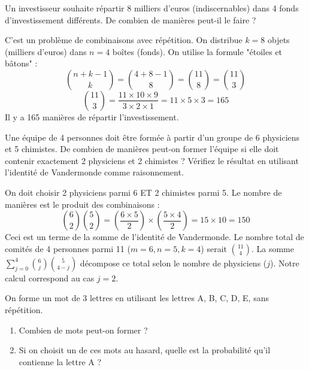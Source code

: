 \begin{exercicebox}
Un investisseur souhaite répartir 8 milliers d'euros (indiscernables) dans 4 fonds d'investissement différents. De combien de manières peut-il le faire ?
\end{exercicebox}

\begin{correctionbox}
C'est un problème de combinaisons avec répétition. On distribue $k=8$ objets (milliers d'euros) dans $n=4$ boîtes (fonds).
On utilise la formule "étoiles et bâtons" :
$$ \binom{n+k-1}{k} = \binom{4+8-1}{8} = \binom{11}{8} = \binom{11}{3} $$
$$ \binom{11}{3} = \frac{11 \times 10 \times 9}{3 \times 2 \times 1} = 11 \times 5 \times 3 = 165 $$
Il y a 165 manières de répartir l'investissement.
\end{correctionbox}

\begin{exercicebox}
Une équipe de 4 personnes doit être formée à partir d'un groupe de 6 physiciens et 5 chimistes. De combien de manières peut-on former l'équipe si elle doit contenir exactement 2 physiciens et 2 chimistes ? Vérifiez le résultat en utilisant l'identité de Vandermonde comme raisonnement.
\end{exercicebox}

\begin{correctionbox}
On doit choisir 2 physiciens parmi 6 ET 2 chimistes parmi 5. Le nombre de manières est le produit des combinaisons :
$$ \binom{6}{2} \binom{5}{2} = \left(\frac{6 \times 5}{2}\right) \times \left(\frac{5 \times 4}{2}\right) = 15 \times 10 = 150 $$
Ceci est un terme de la somme de l'identité de Vandermonde. Le nombre total de comités de 4 personnes parmi 11 ($m=6, n=5, k=4$) serait $\binom{11}{4}$. La somme $\sum_{j=0}^{4} \binom{6}{j} \binom{5}{4-j}$ décompose ce total selon le nombre de physiciens ($j$). Notre calcul correspond au cas $j=2$.
\end{correctionbox}

\begin{exercicebox}
On forme un mot de 3 lettres en utilisant les lettres A, B, C, D, E, sans répétition.
\begin{enumerate}
    \item Combien de mots peut-on former ?
    \item Si on choisit un de ces mots au hasard, quelle est la probabilité qu'il contienne la lettre A ?
\end{enumerate}
\end{exercicebox}

